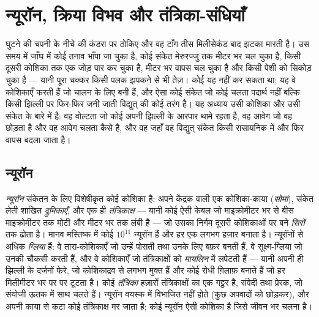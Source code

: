 \chapter{न्यूरॉन, क्रिया विभव और तंत्रिका-संधियाँ}\label{ch:b2:neurons-synapses}

घुटने की चपनी के नीचे की कंडरा पर ठोकिए और वह टाँग तीस
मिलीसेकंड बाद झटका मारती है। उस समय में जाँघ में कोई तनाव
भाँपा जा चुका है, कोई संकेत मेरुरज्जु तक मीटर भर चल चुका है, किसी
दूसरी कोशिका तक एक जोड़ पार कर चुका है, मीटर भर वापस चल चुका है और किसी
पेशी को सिकोड़ चुका है --- यानी पूरा चक्कर किसी पलक झपकने से भी तेज़। कोई
 यह नहीं कर सकता था; यह वे कोशिकाएँ करती हैं जो चालन के लिए बनी हैं, और
ऐसा कोई संकेत जो कोई चलता पदार्थ नहीं बल्कि किसी झिल्ली पर फिर-फिर
जनी जाती विद्युत् की कोई तरंग है। यह अध्याय उसी कोशिका और
उसी संकेत के बारे में है: वह वोल्टता जो कोई  अपनी झिल्ली के आरपार थामे रहता है, वह
आवेग जो वह छोड़ता है और वह आवेग चलता कैसे है, और वह  जहाँ
वह विद्युत् संकेत किसी रासायनिक में और फिर वापस बदला जाता है।

\section{न्यूरॉन}

\begin{definition}[न्यूरॉन, तंत्रिकाक्ष, तंत्रिका]\label{def:b2:neurons-synapses:neuron}
\emph{न्यूरॉन} संकेतन के लिए विशेषीकृत कोई कोशिका है: अपने केंद्रक वाली
एक कोशिका-काया (\emph{सोमा}), संकेत लेती शाखित \emph{द्रुमिकाएँ},
और एक ही \emph{तंत्रिकाक्ष} --- यानी कोई ऐसी केबल जो
माइक्रोमीटर भर से बीस माइक्रोमीटर तक मोटी और मीटर भर तक लंबी है ---
जो उसका निर्गम दूसरी कोशिकाओं पर बने \emph{सिरों} तक ढोता है।
मानव मस्तिष्क में कोई $10^{11}$ न्यूरॉन हैं और हर एक लगभग
हज़ार  बनाता है। न्यूरॉनों से अधिक \emph{ग्लिया} हैं: वे तारा-कोशिकाएँ
जो उन्हें पोसती तथा उनके लिए बफ़र बनती हैं, वे सूक्ष्म-ग्लिया जो उनकी चौकसी करती हैं, और वे
कोशिकाएँ जो तंत्रिकाक्षों को \emph{मायलिन} में लपेटती हैं --- यानी अपनी ही झिल्ली के
दर्जनों फेरे, जो कोशिकाद्रव से लगभग मुक्त हैं और कोई रोधी ग़िलाफ़ बनाते हैं
जो हर मिलीमीटर भर पर \emph{} पर टूटता है।
कोई \emph{तंत्रिका} हज़ारों तंत्रिकाक्षों का एक गट्ठर है, संवेदी तथा प्रेरक,
जो संयोजी ऊतक में साथ चलते हैं। न्यूरॉन वयस्क में विभाजित नहीं
होते (कुछ अपवादों को छोड़कर), और अपनी काया से कटा कोई तंत्रिकाक्ष मर जाता है; कोई
न्यूरॉन ऐसी कोशिका है जिसे जीवन भर चलना है।
\end{definition}

